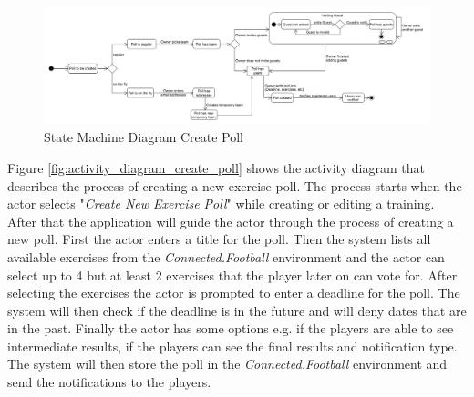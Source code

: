 \begin{figure}[H]
    \begin{center}
        \includegraphics[width=1\textwidth]{images/diagrams/state_machine_diagrams/StateDiagram_CreatePoll.png}
        \caption{State Machine Diagram Create Poll}
        \label{fig:state_machine_diagram_create_poll}
    \end{center}
\end{figure}

Figure \ref{fig:activity_diagram_create_poll} shows the activity diagram that describes the process of creating a new exercise poll. 
\newline
The process starts when the actor selects "\textit{Create New Exercise Poll}" while creating or editing a training. After that the application will guide the actor through the process of creating a new poll. First the actor enters a title for the poll. Then the system lists all available exercises from the \textit{Connected.Football} environment and the actor can select up to 4 but at least 2 exercises that the player later on can vote for. After selecting the exercises the actor is prompted to enter a deadline for the poll. The system will then check if the deadline is in the future and will deny dates that are in the past. Finally the actor has some options e.g. if the players are able to see intermediate results, if the players can see the final results and notification type. The system will then store the poll in the \textit{Connected.Football} environment and send the notifications to the players. 



